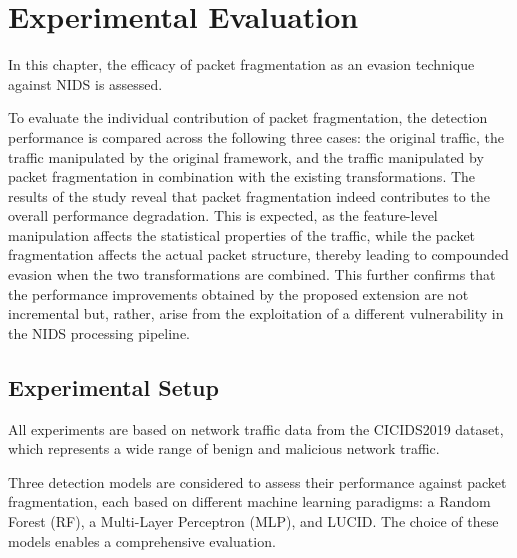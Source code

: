 \chapter{Experimental Evaluation}
\label{cha:evaluation}
In this chapter, the efficacy of packet fragmentation as an evasion technique against NIDS is assessed. 

To evaluate the individual contribution of packet fragmentation, the detection performance is compared across the following three cases: the original traffic, the traffic manipulated by the original framework, and the traffic manipulated by packet fragmentation in combination with the existing transformations.
The results of the study reveal that packet fragmentation indeed contributes to the overall performance degradation.
This is expected, as the feature-level manipulation affects the statistical properties of the traffic, while the packet fragmentation affects the actual packet structure, thereby leading to compounded evasion when the two transformations are combined.
This further confirms that the performance improvements obtained by the proposed extension are not incremental but, rather, arise from the exploitation of a different vulnerability in the NIDS processing pipeline.

\section{Experimental Setup}

All experiments are based on network traffic data from the CICIDS2019 dataset, which represents a wide range of benign and malicious network traffic.

Three detection models are considered to assess their performance against packet fragmentation, each based on different machine learning paradigms: a Random Forest (RF), a Multi-Layer Perceptron (MLP), and LUCID. 
The choice of these models enables a comprehensive evaluation. 



